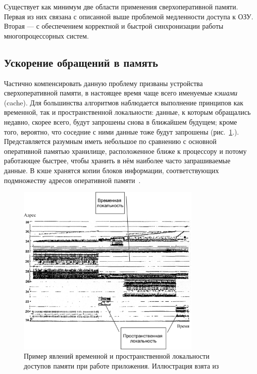 Существует как минимум две области применения сверхоперативной памяти. Первая из них связана с описанной выше проблемой медленности доступа к ОЗУ. Вторая --- с обеспечением корректной и быстрой синхронизации работы многопроцессорных систем.

\subsection{Ускорение обращений в память}

Частично компенсировать данную проблему призваны устройства сверхоперативной памяти, в настоящее время чаще всего именуемые \textit{кэшами} (\abbr cache). Для большинства алгоритмов наблюдается выполнение принципов как временной, так  и пространственной  локальности: данные, к которым обращались недавно, скорее всего, будут запрошены снова в ближайшем будущем; кроме того, вероятно, что соседние с ними данные тоже будут запрошены (рис.~\ref{fig:locality}.). Представляется разумным иметь небольшое по сравнению с основной оперативной памятью хранилище, расположенное ближе к процессору и потому работающее быстрее, чтобы хранить в нём наиболее часто запрашиваемые данные. В кэше хранятся копии блоков информации, соответствующих подмножеству адресов оперативной памяти~\cite{ulrich-cpumemory, ulrich-cpumemory-rus}.

\begin{figure}[htb]
    \centering
    \includegraphics[width=0.80\textwidth]{./locality-crop.pdf}
    \caption[Пример явлений временной и пространственной локальности]{Пример явлений временной и пространственной локальности доступов памяти при работе приложения. Иллюстрация взята из~\cite{DBLP:journals/ibmsj/HatfieldG71}}
    \label{fig:locality}
\end{figure}


